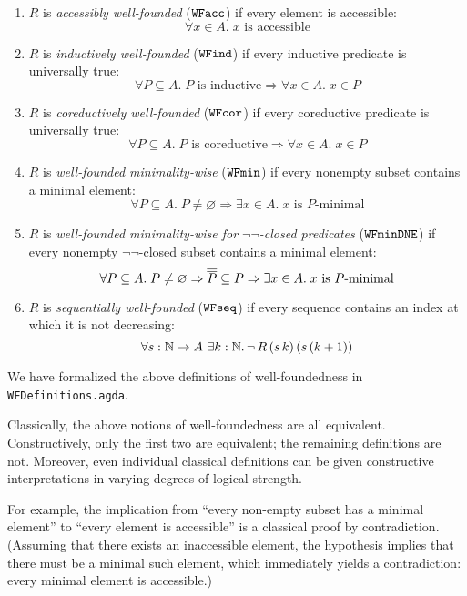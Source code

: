\begin{definition} \label{def:WFproperties} \hfill 
  \begin{enumerate}
    \item $R$ is \emph{accessibly well-founded} ($\mathtt{WFacc}$) if every element is accessible:
      \[
        \forall x \in A.\; x \text{ is accessible}
      \]
    \item $R$ is \emph{inductively well-founded} ($\mathtt{WFind}$) if every inductive predicate is universally true:
      \[
        \forall P \subseteq A.\;\text{$P$ is inductive} \Rightarrow \forall x \in A.\; x \in P
      \]
    \item $R$ is \emph{coreductively well-founded} ($\mathtt{WFcor}$) if every coreductive predicate is universally true:
      \[
        \forall P \subseteq A.\;\text{$P$ is coreductive} \Rightarrow \forall x \in A.\; x \in P
      \]
    \item  $R$ is \emph{well-founded minimality-wise} ($\mathtt{WFmin}$) if every nonempty subset contains a minimal element:
      \[
        \forall P \subseteq A.\; P \neq \varnothing \Rightarrow
        \exists x \in A.\; \text{$x$ is $P$-minimal}
      \]
    \item  $R$ is \emph{well-founded minimality-wise for $\lnot \lnot$-closed predicates} ($\mathtt{WFminDNE}$) if every nonempty $\lnot \lnot$-closed subset contains a minimal element:
      \[
        \forall P \subseteq A.\; P \neq \varnothing \Rightarrow \overline{\overline{P}} \subseteq P \Rightarrow
        \exists x \in A.\; \text{$x$ is $P$-minimal}
      \]
   \item $R$ is \emph{sequentially well-founded} ($\mathtt{WFseq}$) if every sequence contains an index at which it is not decreasing:
      \[
        \forall s : \mathbb{N} \to A\ \exists k : \mathbb{N}.\, \lnot \, R \,(s\,k)\,(s\,(k+1))
      \]
  \end{enumerate}
\end{definition}
We have formalized the above definitions of well-foundedness in \texttt{WFDefinitions.agda}. 

Classically, the above notions of well-foundedness are all equivalent.  Constructively, only the first two are equivalent; the remaining definitions are not. Moreover, even individual classical definitions can be given constructive
interpretations in varying degrees of logical strength.

For example, the implication from ``every non-empty subset has a minimal element'' to
``every element is accessible''  is a classical proof by contradiction.
(Assuming that there exists an inaccessible element, the hypothesis implies that
there must be a minimal such element, which immediately yields a contradiction:
every minimal element is accessible.)

